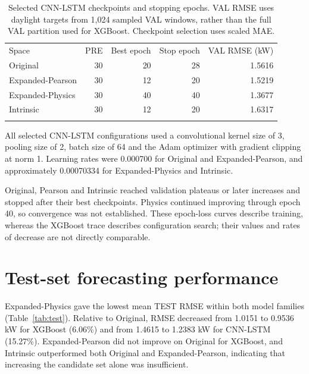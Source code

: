 \documentclass[10pt,a4paper]{article}
\newcommand{\toprule}{\noalign{\hrule height .7pt\vskip3pt}}
\newcommand{\midrule}{\noalign{\vskip2pt\hrule height .4pt\vskip2pt}}
\newcommand{\bottomrule}{\noalign{\vskip3pt\hrule height .7pt}}
\begin{document}
\begin{table}[htbp]
\centering\small
\begin{tabular}{@{}lrrrr@{}}\toprule
Space & PRE & Best epoch & Stop epoch & VAL RMSE (kW) \\\midrule
Original & 30 & 20 & 28 & 1.5616 \\
Expanded-Pearson & 30 & 12 & 20 & 1.5219 \\
Expanded-Physics & 30 & 40 & 40 & 1.3677 \\
Intrinsic & 30 & 12 & 20 & 1.6317 \\
\bottomrule\end{tabular}
\caption{Selected CNN-LSTM checkpoints and stopping epochs. VAL RMSE uses daylight targets from 1,024 sampled VAL windows, rather than the full VAL partition used for XGBoost. Checkpoint selection uses scaled MAE.}\label{tab:cnn}
\end{table}

All selected CNN-LSTM configurations used a convolutional kernel size of 3, pooling size of 2, batch size of 64 and the Adam optimizer with gradient clipping at norm 1. Learning rates were 0.000700 for Original and Expanded-Pearson, and approximately 0.00070334 for Expanded-Physics and Intrinsic.

Original, Pearson and Intrinsic reached validation plateaus or later increases and stopped after their best checkpoints. Physics continued improving through epoch 40, so convergence was not established. These epoch-loss curves describe training, whereas the XGBoost trace describes configuration search; their values and rates of decrease are not directly comparable.

\clearpage
\section{Test-set forecasting performance}
Expanded-Physics gave the lowest mean TEST RMSE within both model families (Table~\ref{tab:test}). Relative to Original, RMSE decreased from 1.0151 to 0.9536 kW for XGBoost (6.06\%) and from 1.4615 to 1.2383 kW for CNN-LSTM (15.27\%). Expanded-Pearson did not improve on Original for XGBoost, and Intrinsic outperformed both Original and Expanded-Pearson, indicating that increasing the candidate set alone was insufficient.
\end{document}
